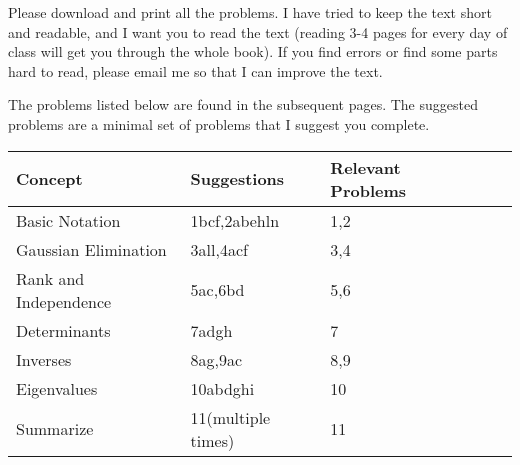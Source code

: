 Please download and print all the problems. I have tried to keep the text short and readable, and I want you to read the text (reading 3-4 pages for every day of class will get you through the whole book). If you find errors or find some parts hard to read, please email me so that I can improve the text.




The problems listed below are found in the subsequent pages. The suggested problems are a minimal set of problems that I suggest you complete.
\begin{center}
\begin{tabular}{|l|l|l|l|l|}
\hline
Concept&Suggestions&Relevant Problems\\ \hline
Basic Notation&1bcf,2abehln&1,2\\ \hline
Gaussian Elimination&3all,4acf&3,4\\ \hline
Rank and Independence&5ac,6bd&5,6\\ \hline
Determinants&7adgh&7\\ \hline
Inverses&8ag,9ac&8,9\\ \hline
Eigenvalues&10abdghi&10\\ \hline
Summarize&11(multiple times)&11\\ \hline
\end{tabular}
\end{center}


